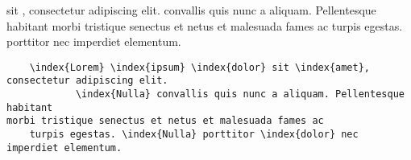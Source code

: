 \documentclass{book}
\begin{document}
\begin{something}
	   sit , consectetur adipiscing elit.
	 convallis quis nunc a aliquam. Pellentesque habitant
	morbi tristique senectus et netus et malesuada fames ac
	turpis egestas.  porttitor  nec imperdiet elementum.
\end{something}

\begin{verbatim}
    \index{Lorem} \index{ipsum} \index{dolor} sit \index{amet}, consectetur adipiscing elit. 
            \index{Nulla} convallis quis nunc a aliquam. Pellentesque habitant 
morbi tristique senectus et netus et malesuada fames ac 
    turpis egestas. \index{Nulla} porttitor \index{dolor} nec imperdiet elementum. 
\end{verbatim}
\end{document}
